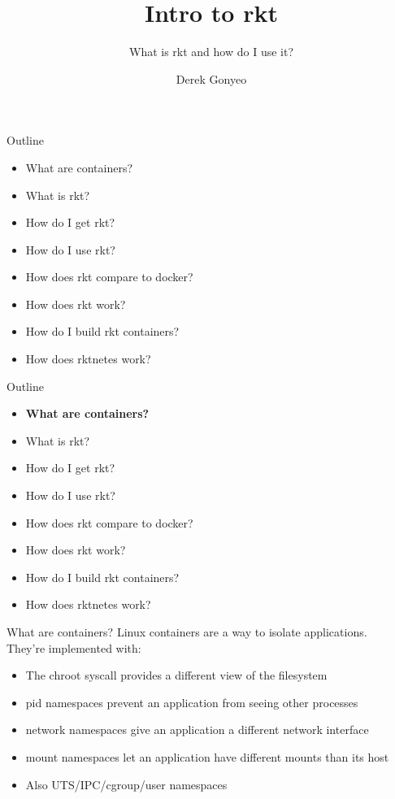 \documentclass[pdf,aspectratio=169,14pt]{beamer}
\title{Intro to rkt}
\subtitle{What is rkt and how do I use it?}
\author{Derek Gonyeo}
\begin{document}

\begin{frame}
    \titlepage
\end{frame}

\begin{frame}
    Outline
    \begin{itemize}
        \item What are containers?
        \item What is rkt?
        \item How do I get rkt?
        \item How do I use rkt?
        \item How does rkt compare to docker?
        \item How does rkt work?
        \item How do I build rkt containers?
        \item How does rktnetes work?
    \end{itemize}
\end{frame}


\begin{frame}
    Outline
    \begin{itemize}
        \item \textbf{What are containers?}
        \item What is rkt?
        \item How do I get rkt?
        \item How do I use rkt?
        \item How does rkt compare to docker?
        \item How does rkt work?
        \item How do I build rkt containers?
        \item How does rktnetes work?
    \end{itemize}
\end{frame}

\begin{frame}{What are containers?}
    Linux containers are a way to isolate applications. \\
    \vspace{1em}
    \pause
    They're implemented with:
    \begin{itemize}
        \item The chroot syscall provides a different view of the filesystem
        \item pid namespaces prevent an application from seeing other processes
        \item network namespaces give an application a different network
            interface
        \item mount namespaces let an application have different mounts than
            its host
        \item Also UTS/IPC/cgroup/user namespaces
    \end{itemize}
\end{frame}
\end{document}
